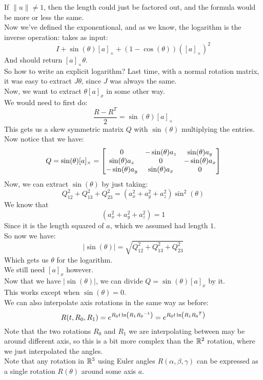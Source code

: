 \documentclass[12pt]{article}
\begin{document}
If $\|u\| \neq 1$, then the length
could just be factored out,
and the formula would be more or less
the same. \\ 

Now we've defined the exponentional,
and as we know, the logarithm is the inverse
operation: takes as input:
\[ I + \sin(\theta)[a]_\times 
+ (1-\cos(\theta))([a]_\times)^2 \]
And should return $[a]_\times\theta$. \\

So how to write an explicit logarithm?
Last time, with a normal rotation matrix,
it was easy to extract $J\theta$,
since $J$ was always the same. \\
Now, we want to extract $\theta[a]_x$
in some other way. \\

We would need to first do:
\[ \dfrac{R - R^T}{2} = \sin(\theta)[a]_\times \]
This gets us a skew symmetric matrix $Q$
with $\sin(\theta)$ multiplying the entries.
Now notice that we have:
\[ Q = \sin(\theta)[a]_\times
= \begin{bmatrix} 0 & -\sin(\theta)a_z & \sin(\theta)a_y \\
\sin(\theta)a_z & 0 & -\sin(\theta)a_x \\
-\sin(\theta)a_y & \sin(\theta)a_x & 0 \end{bmatrix}\]
Now, we can extract $\sin(\theta)$
by just taking:
\[ Q_{12}^2 + Q_{13}^2 + Q_{23}^2
= (a_x^2 + a_y^2 + a_z^2)\sin^2(\theta) \]
We know that
\[(a_x^2 + a_y^2 + a_z^2) = 1\]
Since it is the length squared of $a$,
which we assumed had length $1$. \\
So now we have:
\[ |\sin(\theta)| 
= \sqrt{Q_{12}^2 + Q_{13}^2 + Q_{23}^2} \]
Which gets us $\theta$ for the logarithm. \\

We still need $[a]_x$ however. \\
Now that we have $|\sin(\theta)|$,
we can divide $Q = \sin(\theta)[a]_x$
by it. \\
This works except when $\sin(\theta) = 0$. \\

We can also interpolate axis rotations
in the same way as before:
\[ R(t,R_0,R_1) = 
e^{{R_0t\ln\left( {R_1}{R_0}^{-1} \right)}}
= e^{{R_0t\ln\left( {R_1}{R_0}^T \right)}} \]
Note that the two rotations $R_0$
and $R_1$ we are
interpolating between may be around different
axis, so this is a bit more complex than the $\mathbb{R}^2$
rotation, where we just interpolated
the angles. \\

Note that any rotation in $\mathbb{R}^3$
using Euler angles
$R(\alpha, \beta, \gamma)$
can be expressed as a single rotation
$R(\theta)$ around some axis $a$. \\
\end{document}
